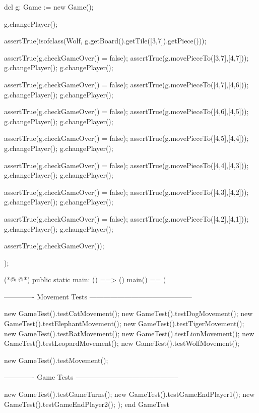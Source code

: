 \begin{vdmpp}[breaklines=true]
         dcl g: Game := new Game();
         
         g.changePlayer();
         
         assertTrue(isofclass(Wolf, g.getBoard().getTile([3,7]).getPiece()));
         
         assertTrue(g.checkGameOver() = false);
         assertTrue(g.movePieceTo([3,7],[4,7]));
         g.changePlayer(); g.changePlayer();
         
         assertTrue(g.checkGameOver() = false);
         assertTrue(g.movePieceTo([4,7],[4,6]));
         g.changePlayer(); g.changePlayer();
         
         assertTrue(g.checkGameOver() = false);
         assertTrue(g.movePieceTo([4,6],[4,5]));
         g.changePlayer(); g.changePlayer();
         
         assertTrue(g.checkGameOver() = false);
         assertTrue(g.movePieceTo([4,5],[4,4]));
         g.changePlayer(); g.changePlayer();
         
         assertTrue(g.checkGameOver() = false);
         assertTrue(g.movePieceTo([4,4],[4,3]));
         g.changePlayer(); g.changePlayer();
         
         assertTrue(g.checkGameOver() = false);
         assertTrue(g.movePieceTo([4,3],[4,2]));
         g.changePlayer(); g.changePlayer();
         
         assertTrue(g.checkGameOver() = false);
         assertTrue(g.movePieceTo([4,2],[4,1]));
         g.changePlayer(); g.changePlayer();
         
         assertTrue(g.checkGameOver());

  );

(*@
\label{main:395}
@*)
 public static main: () ==> ()
                main() ==
                (    
                
                ------------- Movement Tests --------------------------------------------
                
                        new GameTest().testCatMovement();
                        new GameTest().testDogMovement();
                        new GameTest().testElephantMovement();
                        new GameTest().testTigerMovement();
                        new GameTest().testRatMovement();
                        new GameTest().testLionMovement();
                        new GameTest().testLeopardMovement();
                        new GameTest().testWolfMovement();
                        
                        new GameTest().testMovement();
                        
                ------------- Game Tests --------------------------------------------
                        
                        
                        new GameTest().testGameTurns();
                        new GameTest().testGameEndPlayer1();
                        new GameTest().testGameEndPlayer2();
                );
end GameTest
\end{vdmpp}

